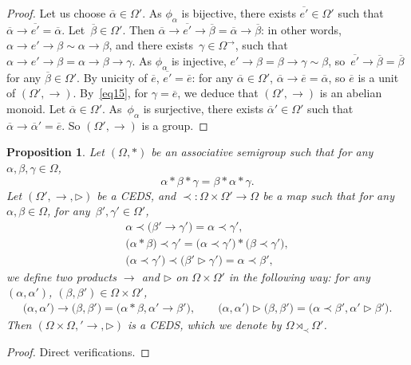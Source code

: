 \documentclass[10pt,a4paper]{amsart}
\numberwithin{equation}{section}
\newtheorem{Proposition}[Theorem]{Proposition}
 { \theoremstyle{definition}
\newtheorem{Definition}[Theorem]{Definition}
\newtheorem{Note}[Theorem]{Note}
\newtheorem{Example}[Theorem]{Example}
\newtheorem{Remark}[Theorem]{Remark}
\newtheorem{Notation}[Theorem]{Notation}}
\begin{document}
\begin{proof}
Let us choose $\overline{\alpha}\in \Omega'$. As $\phi_\alpha$ is bijective, there exists $\overline{e'}\in \Omega'$ such that $\overline{\alpha}\rightarrow \overline{e'}=\overline{\alpha}$.
Let~${\overline{\beta}\in \Omega'}$. Then $\overline{\alpha}\rightarrow \overline{e'}\rightarrow \overline{\beta}=\overline{\alpha}\rightarrow \overline{\beta}$:
in other words, $\alpha \rightarrow e'\rightarrow \beta\sim \alpha \rightarrow \beta$, and there exists~${\gamma \in \Omega^\rightarrow}$, such that $\alpha \rightarrow e'\rightarrow \beta=\alpha \rightarrow \beta \rightarrow \gamma$.
As $\phi_\alpha$ is injective, $e'\rightarrow \beta=\beta \rightarrow \gamma\sim \beta$, so~${\overline{e'}\rightarrow \overline{\beta}=\overline{\beta}}$ for any $\overline{\beta}\in \Omega'$.
By unicity of $\overline{e}$, $\overline{e'}=\overline{e}$: for any $\overline{\alpha}\in \Omega'$, $\overline{\alpha}\rightarrow\overline{e}=\overline{\alpha}$, so $\overline{e}$ is a unit of $(\Omega',\rightarrow)$.
By~\eqref{eq15}, for $\gamma=\overline{e}$, we deduce that $(\Omega',\rightarrow)$ is an abelian monoid.
Let $\overline{\alpha}\in \Omega'$. As~${\phi_\alpha}$ is surjective, there exists $\overline{\alpha}'\in \Omega'$ such that $\overline{\alpha}\rightarrow \overline{\alpha}'=\overline{e}$. So $(\Omega',\rightarrow)$ is a group. \end{proof}

{\samepage
\begin{Proposition}
Let $(\Omega,*)$ be an associative semigroup such that for any $\alpha,\beta,\gamma \in \Omega$,
\[\alpha*\beta * \gamma=\beta *\alpha*\gamma.\]
Let $(\Omega',\rightarrow,\triangleright)$ be a CEDS, and $\prec\colon\Omega \times \Omega'\longrightarrow \Omega$ be a map such that for any $\alpha,\beta \in \Omega$, for any~${\beta',\gamma'\in \Omega'}$,
\begin{gather}
\label{eq27} \alpha \prec \bigl(\beta'\rightarrow \gamma'\bigr)=\alpha \prec \gamma',\\
\label{eq28} \bigl(\alpha *\beta\bigr)\prec \gamma' =\bigl(\alpha \prec \gamma'\bigr)*\bigl(\beta \prec \gamma'\bigr),\\
\label{eq29} \bigl(\alpha\prec \gamma'\bigr)\prec \bigl(\beta'\triangleright \gamma'\bigr)=\alpha \prec \beta',
\end{gather}
we define two products $\rightarrow$ and $\triangleright$ on $\Omega\times \Omega'$ in the following way: for any $(\alpha,\alpha')$, $(\beta,\beta')\in \Omega \times \Omega'$,
\begin{gather*}
\bigl(\alpha,\alpha'\bigr)\rightarrow \bigl(\beta,\beta'\bigr)=\bigl(\alpha*\beta,\alpha'\rightarrow \beta'\bigr),\qquad
\bigl(\alpha,\alpha'\bigr)\triangleright \bigl(\beta,\beta'\bigr)=\bigl(\alpha \prec \beta',\alpha'\triangleright \beta'\bigr).
\end{gather*}
Then $(\Omega\times \Omega,'\rightarrow,\triangleright)$ is a CEDS, which we denote by $\Omega \rtimes_\prec \Omega'$.
\end{Proposition}

\begin{proof}
Direct verifications.
\end{proof}

}
\end{document}
